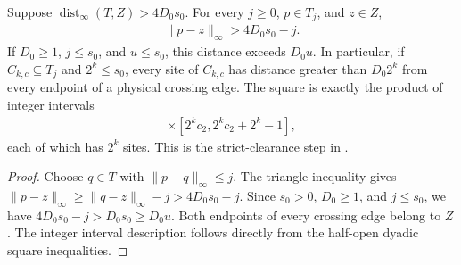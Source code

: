 \begin{lemma}
    \label{lem:area_law_template_dyadic_clearance}
    \leanok
    Suppose $\operatorname{dist}_\infty(T,Z)>4D_0s_0$.
    For every $j\ge0$, $p\in T_j$, and $z\in Z$,
    \begin{align}
        \|p-z\|_\infty>4D_0s_0-j.
    \end{align}
    If $D_0\ge1$, $j\le s_0$, and $u\le s_0$, this distance exceeds $D_0u$.
    In particular, if $C_{k,c}\subseteq T_j$ and $2^k\le s_0$, every site
    of $C_{k,c}$ has distance greater than $D_0 2^k$ from every endpoint
    of a physical crossing edge. The square is exactly the product of
    integer intervals
    \begin{align}
        [2^kc_1,2^kc_1+2^k-1]\times[2^kc_2,2^kc_2+2^k-1],
    \end{align}
    each of which has $2^k$ sites. This is the strict-clearance step in
    \cite[Lemma~9.4]{OpenAI2026AreaLaw}.
\end{lemma}
\begin{proof}
    \leanok
    Choose $q\in T$ with $\|p-q\|_\infty\le j$. The triangle inequality gives
    $\|p-z\|_\infty\ge\|q-z\|_\infty-j>4D_0s_0-j$.
    Since $s_0>0$, $D_0\ge1$, and $j\le s_0$, we have
    $4D_0s_0-j>D_0s_0\ge D_0u$.
    Both endpoints of every crossing edge belong to $Z$.
    The integer interval description follows directly from the half-open
    dyadic square inequalities.
\end{proof}

